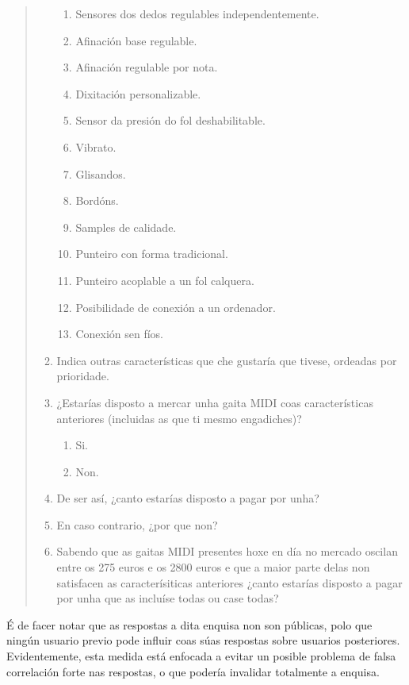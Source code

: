 \begin{quotation}
\begin{enumerate}
\begin{enumerate}
         \item Sensores dos dedos regulables independentemente.
         \item Afinación base regulable.
         \item Afinación regulable por nota.
         \item Dixitación personalizable.
         \item Sensor da presión do fol deshabilitable.
         \item Vibrato.
         \item Glisandos.
         \item Bordóns.
         \item Samples de calidade.
         \item Punteiro con forma tradicional.
         \item Punteiro acoplable a un fol calquera.
         \item Posibilidade de conexión a un ordenador.
         \item Conexión sen fíos.
        \end{enumerate}
  \item Indica outras características que che gustaría que tivese, ordeadas por
        prioridade.
  \item ¿Estarías disposto a mercar unha gaita MIDI coas características
        anteriores (incluidas as que ti mesmo engadiches)?
        \begin{enumerate}
         \item Si.
         \item Non.
        \end{enumerate}
  \item De ser así, ¿canto estarías disposto a pagar por unha?
  \item En caso contrario, ¿por que non?
  \item Sabendo que as gaitas MIDI presentes hoxe en día no mercado oscilan
        entre os 275 euros e os 2800 euros e que a maior parte delas non
        satisfacen as caracterísiticas anteriores ¿canto estarías disposto a
        pagar por unha que as incluíse todas ou case todas?
 \end{enumerate}
\end{quotation}

É de facer notar que as respostas a dita enquisa non son públicas, polo que
ningún usuario previo pode influir coas súas respostas sobre usuarios
posteriores. Evidentemente, esta medida está enfocada a evitar un posible
problema de falsa correlación forte nas respostas, o que podería invalidar
totalmente a enquisa.\\


